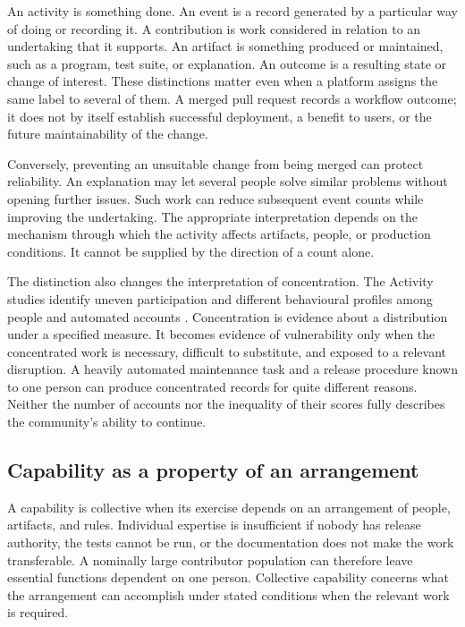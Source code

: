 An activity is something done. An event is a record generated by a particular way of doing or recording it. A contribution is work considered in relation to an undertaking that it supports. An artifact is something produced or maintained, such as a program, test suite, or explanation. An outcome is a resulting state or change of interest. These distinctions matter even when a platform assigns the same label to several of them. A merged pull request records a workflow outcome; it does not by itself establish successful deployment, a benefit to users, or the future maintainability of the change.

Conversely, preventing an unsuitable change from being merged can protect reliability. An explanation may let several people solve similar problems without opening further issues. Such work can reduce subsequent event counts while improving the undertaking. The appropriate interpretation depends on the mechanism through which the activity affects artifacts, people, or production conditions. It cannot be supplied by the direction of a count alone.

The distinction also changes the interpretation of concentration. The Activity studies identify uneven participation and different behavioural profiles among people and automated accounts \citep{xia2022,xia2024thesis}. Concentration is evidence about a distribution under a specified measure. It becomes evidence of vulnerability only when the concentrated work is necessary, difficult to substitute, and exposed to a relevant disruption. A heavily automated maintenance task and a release procedure known to one person can produce concentrated records for quite different reasons. Neither the number of accounts nor the inequality of their scores fully describes the community's ability to continue.

\subsection{Capability as a property of an arrangement}
A capability is collective when its exercise depends on an arrangement of people, artifacts, and rules. Individual expertise is insufficient if nobody has release authority, the tests cannot be run, or the documentation does not make the work transferable. A nominally large contributor population can therefore leave essential functions dependent on one person. Collective capability concerns what the arrangement can accomplish under stated conditions when the relevant work is required.

